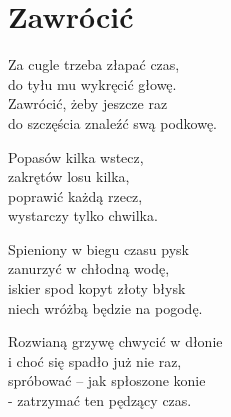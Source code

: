 \section{Zawrócić}
\begin{text}
Za cugle trzeba złapać czas,\\
do tyłu mu wykręcić głowę.\\
Zawrócić, żeby jeszcze raz\\
do szczęścia znaleźć swą podkowę.

\vin Popasów kilka wstecz,\\
\vin zakrętów losu kilka,\\
\vin poprawić każdą rzecz,\\
\vin wystarczy tylko chwilka.

Spieniony w biegu czasu pysk\\
zanurzyć w chłodną wodę,\\
iskier spod kopyt złoty błysk\\
niech wróżbą będzie na pogodę.

Rozwianą grzywę chwycić w dłonie\\
i choć się spadło już nie raz,\\
spróbować – jak spłoszone konie\\
- zatrzymać ten pędzący czas.
\end{text}